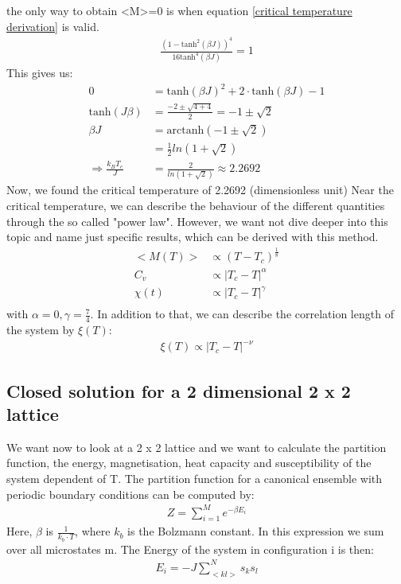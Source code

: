 \documentclass[10pt,a4paper]{article}
\begin{document}
the only way to obtain <M>=0 is when equation \ref{critical temperature derivation} is valid. 
\begin{align}
\frac{(1 - \mathrm{tanh}^2(\beta J))^{4}}{16\mathrm{tanh}^{4}(\beta J)} = 1 \label{critical temperature derivation}
\end{align}
This gives us:
\begin{align}
0&=\mathrm{tanh}(\beta J )^2+2 \cdot \mathrm{tanh}(\beta J ) -1 \\
\mathrm{tanh}(J \beta ) &= \frac{-2 \pm \sqrt{4+4}}{2} = -1 \pm \sqrt{2}\\
\beta J &= \mathrm{arctanh}(-1 \pm \sqrt{2})\\
&= \frac{1}{2} ln(1+\sqrt{2})\\
\Rightarrow \frac {k_B T_c}{J} &= \frac{2}{ln(1+\sqrt{2})}\approx 2.2692
\end{align}
Now, we found the critical temperature of 2.2692 (dimensionless unit)
Near the critical temperature, we can describe the behaviour of the different quantities through the so called "power law". However, we want not dive deeper into this topic and name just specific results, which can be derived with this method.
\begin{align}
<M(T)> & \propto (T-T_c)^{\frac{1}{8}}\\
C_v & \propto \left| T_c - T \right|^{\alpha}\\
\chi ( t)& \propto \left| T_c - T \right|^{\gamma}\\
\end{align}
with $\alpha=0, \gamma=\frac{7}{4} $. In addition to that, we can describe the correlation length of the system by $\xi(T) $:
\begin{align}
\xi (T) \propto \left| T_c - T \right|^{-\nu}
\end{align}

\subsection{Closed solution for a 2 dimensional 2 x 2 lattice}

We want now to look at a 2 x 2 lattice and we want to calculate the partition function, the energy, magnetisation, heat capacity and susceptibility of the system  dependent of T. 
The partition function for a canonical ensemble with periodic boundary conditions can be computed  by:
\begin{align}
Z= \sum_{i=1}^{M} e^{- \beta E_i}
\end{align} 
Here, $\beta$ is $\frac{1}{k_b \cdot T}$, where $k_b$ is the Bolzmann constant. 
In this expression we sum over all microstates m. The Energy of the system in configuration i is then:
\begin{align}
E_i = - J \sum_{<kl>}^N s_k s_l 
\end{align} 
\end{document}
